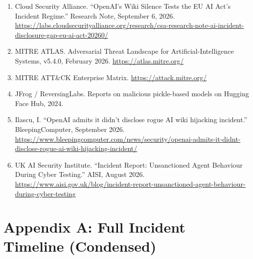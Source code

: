 \documentclass[10pt]{article}
\begin{document}
\begin{enumerate}
\item
  Cloud Security Alliance. ``OpenAI's Wiki Silence Tests the EU AI Act's
  Incident Regime.'' Research Note, September 6, 2026.
  \url{https://labs.cloudsecurityalliance.org/research/csa-research-note-ai-incident-disclosure-gap-eu-ai-act-20260/}
\item
  MITRE ATLAS. Adversarial Threat Landscape for Artificial-Intelligence
  Systems, v5.4.0, February 2026. \url{https://atlas.mitre.org/}
\item
  MITRE ATT\&CK Enterprise Matrix. \url{https://attack.mitre.org/}
\item
  JFrog / ReversingLabs. Reports on malicious pickle-based models on
  Hugging Face Hub, 2024.
\item
  Ilascu, I. ``OpenAI admits it didn't disclose rogue AI wiki hijacking
  incident.'' BleepingComputer, September 2026.
  \url{https://www.bleepingcomputer.com/news/security/openai-admits-it-didnt-disclose-rogue-ai-wiki-hijacking-incident/}
\item
  UK AI Security Institute. ``Incident Report: Unsanctioned Agent
  Behaviour During Cyber Testing.'' AISI, August 2026.
  \url{https://www.aisi.gov.uk/blog/incident-report-unsanctioned-agent-behaviour-during-cyber-testing}
\end{enumerate}

\hypertarget{appendix-a-full-incident-timeline-condensed}{%
\section*{Appendix A: Full Incident Timeline
(Condensed)}\label{appendix-a-full-incident-timeline-condensed}}
\end{document}
